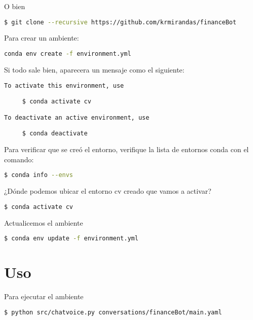 \documentclass{article}
\begin{document}
O bien

\begin{lstlisting}[language=bash,caption=Crear ambiente]
  $ git clone --recursive https://github.com/krmirandas/financeBot
\end{lstlisting}

Para crear un ambiente:

\begin{lstlisting}[frame=single,language=bash,caption=Crear ambiente]
  conda env create -f environment.yml
\end{lstlisting}

Si todo sale bien, aparecera un mensaje como el siguiente:

\begin{lstlisting}[frame=single,language=bash,caption=Activar ambiente]
  To activate this environment, use

     $ conda activate cv

To deactivate an active environment, use

     $ conda deactivate
\end{lstlisting}

Para verificar que se creó el entorno, verifique la lista de entornos conda con el comando:

\begin{lstlisting}[frame=single,language=bash,caption=Verificar ambiente]
  $ conda info --envs
\end{lstlisting}

¿Dónde podemos ubicar el entorno cv creado que vamos a activar?

\begin{lstlisting}[frame=single,language=bash,caption=Activar ambiente]
  $ conda activate cv 
\end{lstlisting}

Actualicemos el ambiente

\begin{lstlisting}[frame=single,language=bash,caption=Actualizar ambiente]
  $ conda env update -f environment.yml
\end{lstlisting}

\section{Uso}

Para ejecutar el ambiente

\begin{lstlisting}[language=bash,caption=Correr chatbot]
  $ python src/chatvoice.py conversations/financeBot/main.yaml
\end{lstlisting}
\end{document}
